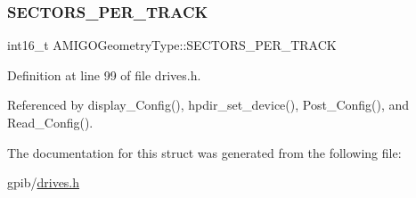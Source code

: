 \subsubsection{\texorpdfstring{S\+E\+C\+T\+O\+R\+S\+\_\+\+P\+E\+R\+\_\+\+T\+R\+A\+CK}{SECTORS\_PER\_TRACK}}
{\footnotesize\ttfamily int16\+\_\+t A\+M\+I\+G\+O\+Geometry\+Type\+::\+S\+E\+C\+T\+O\+R\+S\+\_\+\+P\+E\+R\+\_\+\+T\+R\+A\+CK}



Definition at line 99 of file drives.\+h.



Referenced by display\+\_\+\+Config(), hpdir\+\_\+set\+\_\+device(), Post\+\_\+\+Config(), and Read\+\_\+\+Config().



The documentation for this struct was generated from the following file\+:\begin{DoxyCompactItemize}
\item 
gpib/\hyperlink{drives_8h}{drives.\+h}\end{DoxyCompactItemize}
